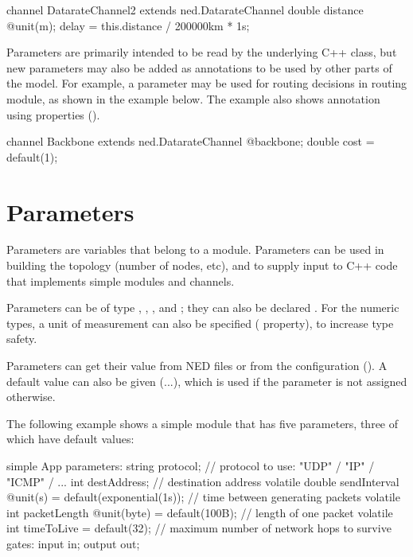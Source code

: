 \begin{ned}
channel DatarateChannel2 extends ned.DatarateChannel
{
    double distance @unit(m);
    delay = this.distance / 200000km * 1s;
}
\end{ned}

Parameters are primarily intended to be read by the underlying C++ class,
but new parameters may also be added as annotations to be used by other
parts of the model. For example, a  parameter may be used for
routing decisions in routing module, as shown in the example below. The
example also shows annotation using properties ().

\begin{ned}
channel Backbone extends ned.DatarateChannel
{
    @backbone;
    double cost = default(1);
}
\end{ned}


\section{Parameters}
\label{sec:ned-lang:parameters}

Parameters are variables that belong to a module. Parameters can be
used in building the topology (number of nodes, etc), and to supply
input to C++ code that implements simple modules and channels.

Parameters can be of type , ,
,  and ; they can also
be declared . For the numeric types, a unit of
measurement can also be specified ( property), to increase
type safety.

Parameters can get their value from NED files or from the configuration
(). A default value can also be given (...\ttt{)}),
which is used if the parameter is not assigned otherwise.

The following example shows a simple module that has five parameters, three
of which have default values:

\begin{ned}
simple App
{
    parameters:
        string protocol;       // protocol to use: "UDP" / "IP" / "ICMP" / ...
        int destAddress;       // destination address
        volatile double sendInterval @unit(s) = default(exponential(1s));
                               // time between generating packets
        volatile int packetLength @unit(byte) = default(100B);
                               // length of one packet
        volatile int timeToLive = default(32);
                               // maximum number of network hops to survive
    gates:
        input in;
        output out;
}
\end{ned}


